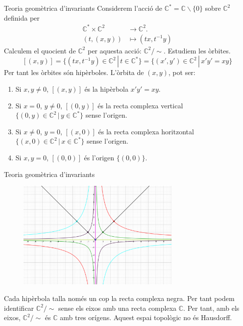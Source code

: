 \documentclass{beamer}
\theoremstyle{definition}
\begin{document}
\begin{frame}{Teoria geom\`{e}trica d'invariants}
Considerem l'acci\'{o} de $\mathbb{C}^*=\mathbb{C}\backslash\{0\}$ sobre $\mathbb{C}^2$ definida per
\begin{align*}
\mathbb{C}^*\times\mathbb{C}^2&\longrightarrow\mathbb{C}^2.\\
(t,(x,y))&\longmapsto(tx,t^{-1}y)
\end{align*}
\pause
Calculem el quocient de $\mathbb{C}^2$ per aquesta acci\'{o}: $\mathbb{C}^2/\sim$. Estudiem les \`{o}rbites.
\[[(x,y)]=\{(tx,t^{-1}y)\in\mathbb{C}^2\,|\,t\in\mathbb{C}^*\}=\{(x',y')\in\mathbb{C}^2\,|\,x'y'=xy\}\]
\pause
Per tant les \`{o}rbites s\'{o}n hip\`{e}rboles. L'\`{o}rbita de $(x,y)$, pot ser:
\begin{enumerate}
\item Si $x,y\neq0$, $[(x,y)]$ \'{e}s la hip\`{e}rbola $x'y'=xy$.
\pause
\item Si $x=0$, $y\neq0$, $[(0,y)]$ \'{e}s la recta complexa vertical $\{(0,y)\in\mathbb{C}^2\,|\,y\in\mathbb{C}^*\}$ sense l'origen.
\pause
\item Si $x\neq0$, $y=0$, $[(x,0)]$ \'{e}s la recta complexa horitzontal $\{(x,0)\in\mathbb{C}^2\,|\,x\in\mathbb{C}^*\}$ sense l'origen.
\pause
\item Si $x,y=0$, $[(0,0)]$ \'{e}s l'origen $\{(0,0)\}$.
\end{enumerate}
\end{frame}

\begin{frame}{Teoria geom\`{e}trica d'invariants}
\begin{figure}[ht!]
\begin{center}
\includegraphics[width=8cm]{Hiperboles.png}
\end{center}
\end{figure}
\pause
Cada hip\`{e}rbola talla nom\'{e}s un cop la recta complexa negra. Per tant podem identificar $\mathbb{C}^2/\sim$ sense els eixos amb una recta complexa $\mathbb{C}$. Per tant, amb els eixos, $\mathbb{C}^2/\sim$ \'{e}s $\mathbb{C}$ amb tres or\'{i}gens. Aquest espai topol\`{o}gic no \'{e}s Hausdorff.
\end{frame}
\end{document}
